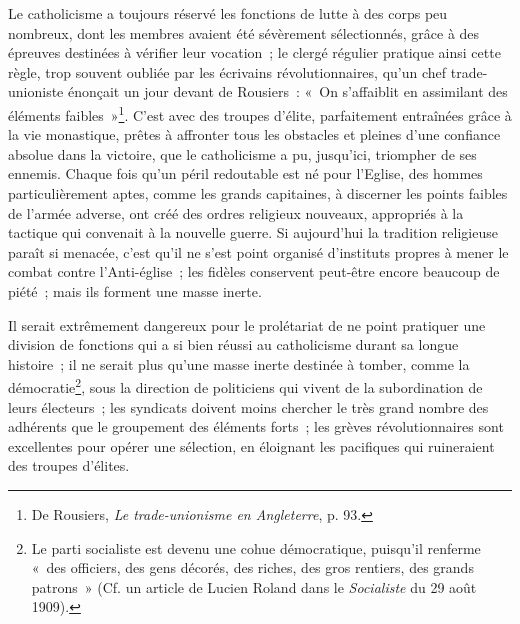 \documentclass[french,twoside]{book} %
\begin{document}
\noindent Le catholicisme a toujours réservé les fonctions de lutte à des corps peu nombreux, dont les membres avaient été sévèrement sélectionnés, grâce à des épreuves destinées à vérifier leur vocation ; le clergé régulier pratique ainsi cette règle, trop souvent oubliée par les écrivains révolutionnaires, qu’un chef trade-unioniste énonçait un jour devant de Rousiers : « On s’affaiblit en assimilant des éléments faibles »\footnote{ \noindent De Rousiers, \emph{Le trade-unionisme en Angleterre}, p. 93.
 }. C’est avec des troupes d’élite, parfaitement entraînées grâce à la vie monastique, prêtes  à affronter tous les obstacles et pleines d’une confiance absolue dans la victoire, que le catholicisme a pu, jusqu’ici, triompher de ses ennemis. Chaque fois qu’un péril redoutable est né pour l’Eglise, des hommes particulièrement aptes, comme les grands capitaines, à discerner les points faibles de l’armée adverse, ont créé des ordres religieux nouveaux, appropriés à la tactique qui convenait à la nouvelle guerre. Si aujourd’hui la tradition religieuse paraît si menacée, c’est qu’il ne s’est point organisé d’instituts propres à mener le combat contre l’Anti-église ; les fidèles conservent peut-être encore beaucoup de piété ; mais ils forment une masse inerte.\par
Il serait extrêmement dangereux pour le prolétariat de ne point pratiquer une division de fonctions qui a si bien réussi au catholicisme durant sa longue histoire ; il ne serait plus qu’une masse inerte destinée à tomber, comme la démocratie\footnote{ \noindent Le parti socialiste est devenu une cohue démocratique, puisqu’il renferme « des officiers, des gens décorés, des riches, des gros rentiers, des grands patrons » (Cf. un article de Lucien Roland dans le \emph{Socialiste} du 29 août 1909).
 }, sous la direction de politiciens qui vivent de la subordination de leurs électeurs ; les syndicats doivent moins chercher le très grand nombre des adhérents que le groupement des éléments forts ; les grèves révolutionnaires sont excellentes pour opérer une sélection, en éloignant les pacifiques qui ruineraient des troupes d’élites.\par
\end{document}
